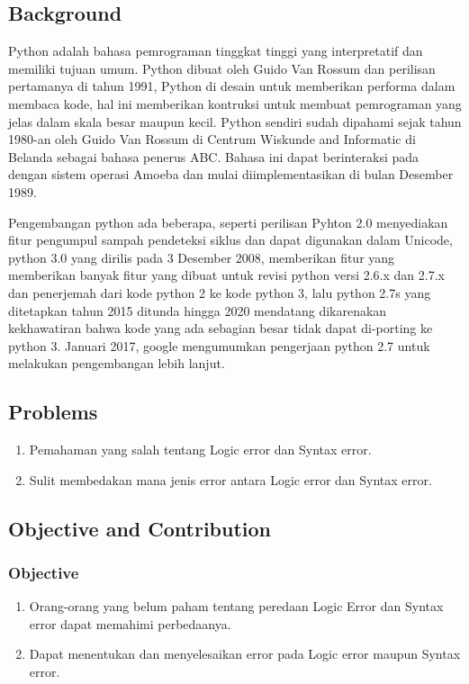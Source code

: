 \subsection{Background}
\par
Python adalah bahasa pemrograman tinggkat tinggi yang interpretatif dan memiliki tujuan umum. Python dibuat oleh Guido Van Rossum dan perilisan pertamanya di tahun 1991, Python di desain untuk memberikan performa dalam membaca kode, hal ini memberikan kontruksi untuk membuat pemrograman yang jelas dalam skala besar maupun kecil. Python sendiri sudah dipahami sejak tahun 1980-an oleh Guido Van Rossum di Centrum Wiskunde and Informatic di Belanda sebagai bahasa penerus ABC. Bahasa ini dapat berinteraksi pada dengan sistem operasi Amoeba dan mulai diimplementasikan di bulan  Desember 1989.
\par
Pengembangan python ada beberapa, seperti perilisan Pyhton 2.0 menyediakan fitur  pengumpul sampah pendeteksi siklus dan dapat digunakan dalam Unicode, python 3.0 yang dirilis pada 3 Desember 2008, memberikan fitur yang memberikan banyak fitur yang dibuat untuk revisi python versi 2.6.x dan 2.7.x dan penerjemah dari kode python 2 ke kode python 3, lalu python 2.7s yang ditetapkan tahun 2015 ditunda hingga 2020 mendatang dikarenakan kekhawatiran bahwa kode yang ada sebagian besar tidak dapat di-porting ke python 3. Januari 2017, google mengumumkan pengerjaan python 2.7 untuk melakukan pengembangan lebih lanjut.

	
\subsection{Problems}
\begin{enumerate}
	\item Pemahaman yang salah tentang Logic error dan Syntax error.
	\item Sulit membedakan mana jenis error antara Logic error dan Syntax error.
\end{enumerate}
	
\subsection{Objective and Contribution}
\subsubsection{Objective}
\begin{enumerate}
	\item Orang-orang yang belum paham tentang peredaan Logic Error dan Syntax error dapat memahimi perbedaanya.
	\item Dapat menentukan dan menyelesaikan error pada Logic error maupun Syntax error.
\end{enumerate}
